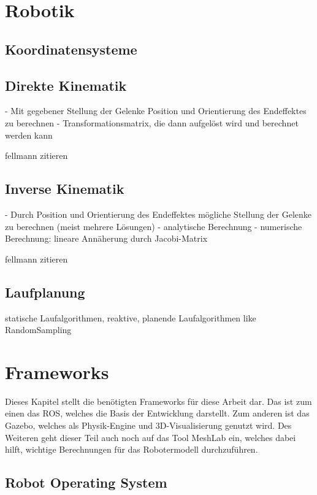 \section{Robotik}

\subsection{Koordinatensysteme}
\subsection{Direkte Kinematik}

- Mit gegebener Stellung der Gelenke Position und Orientierung des Endeffektes zu berechnen
- Transformationsmatrix, die dann aufgelöst wird und berechnet werden kann

fellmann zitieren

\autocite{fellmann2007}

\subsection{Inverse Kinematik}

- Durch Position und Orientierung des Endeffektes mögliche Stellung der Gelenke zu berechnen (meist mehrere Lösungen)
- analytische Berechnung
- numerische Berechnung: lineare Annäherung durch Jacobi-Matrix

fellmann zitieren

\autocite{fellmann2007}

\subsection{Laufplanung}

statische Laufalgorithmen, reaktive, planende Laufalgorithmen like RandomSampling

\section{Frameworks}

Dieses Kapitel stellt die benötigten Frameworks für diese Arbeit dar. Das ist zum einen das \ac{ROS}, welches die Basis der Entwicklung darstellt. Zum anderen ist das Gazebo, welches als Physik-Engine und 3D-Visualisierung genutzt wird. Des Weiteren geht dieser Teil auch noch auf das Tool MeshLab ein, welches dabei hilft, wichtige Berechnungen für das Robotermodell durchzuführen. 

\subsection{Robot Operating System}

